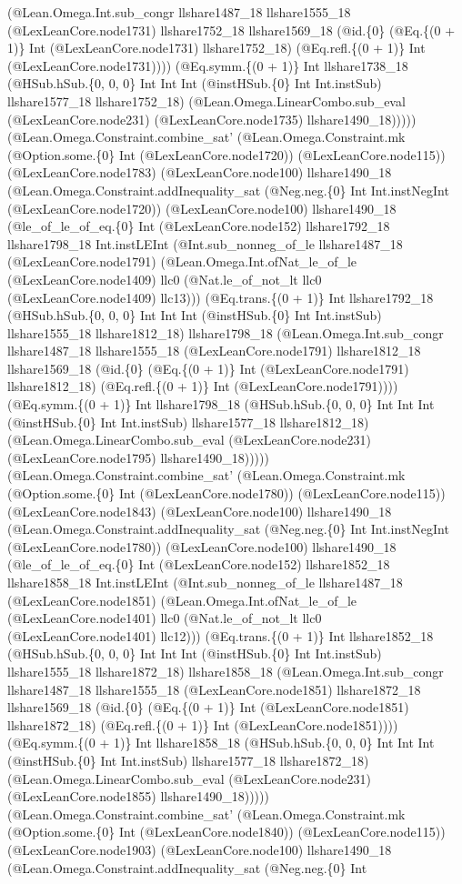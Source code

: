 \documentclass[11pt]{article}
\begin{document}
(@Lean.Omega.Int.sub\_congr llshare1487\_18 llshare1555\_18 (@LexLeanCore.node1731) llshare1752\_18 llshare1569\_18 (@id.\{0\} (@Eq.\{(0 + 1)\} Int (@LexLeanCore.node1731) llshare1752\_18) (@Eq.refl.\{(0 + 1)\} Int (@LexLeanCore.node1731)))) (@Eq.symm.\{(0 + 1)\} Int llshare1738\_18 (@HSub.hSub.\{0, 0, 0\} Int Int Int (@instHSub.\{0\} Int Int.instSub) llshare1577\_18 llshare1752\_18) (@Lean.Omega.LinearCombo.sub\_eval (@LexLeanCore.node231) (@LexLeanCore.node1735) llshare1490\_18))))) (@Lean.Omega.Constraint.combine\_sat' (@Lean.Omega.Constraint.mk (@Option.some.\{0\} Int (@LexLeanCore.node1720)) (@LexLeanCore.node115)) (@LexLeanCore.node1783) (@LexLeanCore.node100) llshare1490\_18 (@Lean.Omega.Constraint.addInequality\_sat (@Neg.neg.\{0\} Int Int.instNegInt (@LexLeanCore.node1720)) (@LexLeanCore.node100) llshare1490\_18 (@le\_of\_le\_of\_eq.\{0\} Int (@LexLeanCore.node152) llshare1792\_18 llshare1798\_18 Int.instLEInt (@Int.sub\_nonneg\_of\_le llshare1487\_18 (@LexLeanCore.node1791) (@Lean.Omega.Int.ofNat\_le\_of\_le (@LexLeanCore.node1409) llc0 (@Nat.le\_of\_not\_lt llc0 (@LexLeanCore.node1409) llc13))) (@Eq.trans.\{(0 + 1)\} Int llshare1792\_18 (@HSub.hSub.\{0, 0, 0\} Int Int Int (@instHSub.\{0\} Int Int.instSub) llshare1555\_18 llshare1812\_18) llshare1798\_18 (@Lean.Omega.Int.sub\_congr llshare1487\_18 llshare1555\_18 (@LexLeanCore.node1791) llshare1812\_18 llshare1569\_18 (@id.\{0\} (@Eq.\{(0 + 1)\} Int (@LexLeanCore.node1791) llshare1812\_18) (@Eq.refl.\{(0 + 1)\} Int (@LexLeanCore.node1791)))) (@Eq.symm.\{(0 + 1)\} Int llshare1798\_18 (@HSub.hSub.\{0, 0, 0\} Int Int Int (@instHSub.\{0\} Int Int.instSub) llshare1577\_18 llshare1812\_18) (@Lean.Omega.LinearCombo.sub\_eval (@LexLeanCore.node231) (@LexLeanCore.node1795) llshare1490\_18))))) (@Lean.Omega.Constraint.combine\_sat' (@Lean.Omega.Constraint.mk (@Option.some.\{0\} Int (@LexLeanCore.node1780)) (@LexLeanCore.node115)) (@LexLeanCore.node1843) (@LexLeanCore.node100) llshare1490\_18 (@Lean.Omega.Constraint.addInequality\_sat (@Neg.neg.\{0\} Int Int.instNegInt (@LexLeanCore.node1780)) (@LexLeanCore.node100) llshare1490\_18 (@le\_of\_le\_of\_eq.\{0\} Int (@LexLeanCore.node152) llshare1852\_18 llshare1858\_18 Int.instLEInt (@Int.sub\_nonneg\_of\_le llshare1487\_18 (@LexLeanCore.node1851) (@Lean.Omega.Int.ofNat\_le\_of\_le (@LexLeanCore.node1401) llc0 (@Nat.le\_of\_not\_lt llc0 (@LexLeanCore.node1401) llc12))) (@Eq.trans.\{(0 + 1)\} Int llshare1852\_18 (@HSub.hSub.\{0, 0, 0\} Int Int Int (@instHSub.\{0\} Int Int.instSub) llshare1555\_18 llshare1872\_18) llshare1858\_18 (@Lean.Omega.Int.sub\_congr llshare1487\_18 llshare1555\_18 (@LexLeanCore.node1851) llshare1872\_18 llshare1569\_18 (@id.\{0\} (@Eq.\{(0 + 1)\} Int (@LexLeanCore.node1851) llshare1872\_18) (@Eq.refl.\{(0 + 1)\} Int (@LexLeanCore.node1851)))) (@Eq.symm.\{(0 + 1)\} Int llshare1858\_18 (@HSub.hSub.\{0, 0, 0\} Int Int Int (@instHSub.\{0\} Int Int.instSub) llshare1577\_18 llshare1872\_18) (@Lean.Omega.LinearCombo.sub\_eval (@LexLeanCore.node231) (@LexLeanCore.node1855) llshare1490\_18))))) (@Lean.Omega.Constraint.combine\_sat' (@Lean.Omega.Constraint.mk (@Option.some.\{0\} Int (@LexLeanCore.node1840)) (@LexLeanCore.node115)) (@LexLeanCore.node1903) (@LexLeanCore.node100) llshare1490\_18 (@Lean.Omega.Constraint.addInequality\_sat (@Neg.neg.\{0\} Int 
\end{document}

